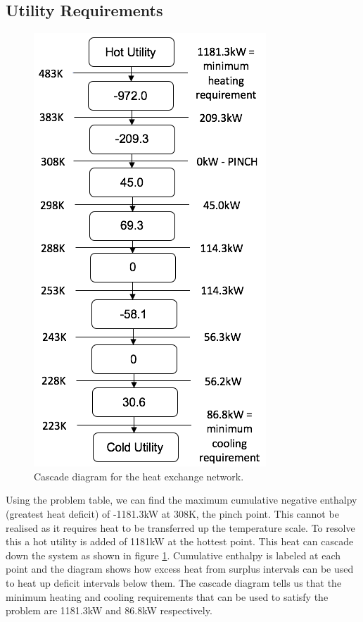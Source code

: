 \subsection{Utility Requirements} \label{ssec:utility}

\begin{figure}
\includegraphics[width=0.9\linewidth]{./pictures/cascade} 
\caption{Cascade diagram for the heat exchange network.}
\label{fig:cascade}
\end{figure}
Using the problem table, we can find the maximum cumulative negative enthalpy (greatest heat deficit) of -1181.3kW at 308K, the pinch point. This cannot be realised as it requires heat to be transferred up the temperature scale. To resolve this a hot utility is added of 1181kW at the hottest point. This heat can cascade down the system as shown in figure \ref{fig:cascade}. Cumulative enthalpy is labeled at each point and the diagram shows how excess heat from surplus intervals can be used to heat up deficit intervals below them. The cascade diagram tells us that the minimum heating and cooling requirements that can be used to satisfy the problem are 1181.3kW and 86.8kW respectively.

